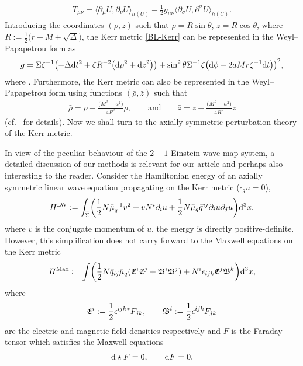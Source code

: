 \documentclass[11pt]{article}
\numberwithin{equation}{section}
\def\eps{\epsilon}%
\def\ptl{\partial}%
\def\ip#1#2{\langle#1,#2\rangle}
\def\olin#1{\overline{#1}{}}%
\newcommand{\leftexp}[2]{{\vphantom{#2}}^{#1}{#2}}
\def\halb{\frac{1}{2}}%
\renewcommand{\r}{\rho}
\numberwithin{equation}{section}
\begin{document}
\begin{align*}
T_{\mu \nu} = \ip{\ptl_\mu U} {\ptl_\nu U }_{h(U)} - \halb g_{\mu \nu} \ip{\ptl_\sigma U}{ \ptl^\sigma U}_{h(U)}.
\end{align*}
Introducing the coordinates $(\r, z)$ such that $\r = R \sin \theta$, $z= R \cos
\theta$, where $R := \halb \bigl(r-M+ \sqrt{\Delta}\bigr)$, the Kerr metric \eqref{BL-Kerr} can be represented in the Weyl--Papapetrou form as
\begin{align*}
\bar{g} = \Sigma \zeta^{-1} \bigl(-\Delta {\rm d}t^2 + \zeta R^{-2} \bigl({\rm d}\r^2 + {\rm d}z^2\bigr)\bigr) + \sin^2\theta \Sigma^{-1} \zeta
\bigl({\rm d}\phi - 2aMr \zeta^{-1} {\rm d}t\bigr)\bigr)^2,
\end{align*}
where . Furthermore, the Kerr metric can also be represented in the Weyl--Papapetrou form using functions $(\bar{\r}, \bar{z})$
such that
\begin{align*}
\bar{\r} = \r - \frac{\bigl(M^2 -a^2\bigr)}{4 R^2}\r, \qquad \text{and} \qquad \bar{z} = z + \frac{\bigl(M^2 -a^2\bigr)}{4 R^2}z
\end{align*}
(cf.\ \cite[Appendix A]{GM17_gentitle} for details). Now we shall turn to the axially symmetric perturbation theory of the Kerr metric.

In view of the peculiar behaviour of the $2 + 1$ Einstein-wave map system, a detailed discussion of our methods is relevant for our article and perhaps also interesting to the reader. Consider the Hamiltonian energy of an axially symmetric linear wave equation propagating on the Kerr metric ($\square_g u =0$),
\begin{align*}
H^{\text{LW}} := \int_{\olin{\Sigma}} \biggl(\halb \bar{N}\bar{\mu}^{-1}_q v^2 + vN^i \ptl_i u+ \halb N \bar{\mu}_q \bar{q}^{ij} \ptl_i u \ptl_j u \biggr) {\rm d}^3 x,
\end{align*}
where $v$ is the conjugate momentum of $u$, the energy is directly positive-definite.
However, this simplification does not carry forward to the Maxwell equations on the Kerr metric
\[
H^{{\rm Max}} := \int \biggl(\halb N \bar{q}_{ij} \bar{\mu}_q (\mathfrak{E}^i \mathfrak{E}^j + \mathfrak{B}^i \mathfrak{B}^j) + N^i \eps_{ijk}\mathfrak{E}^j \mathfrak{B}^k \biggr) {\rm d}^3 x,
\]
where
\[
\mathfrak{E}^i := \halb \eps^{ijk} \leftexp{*}F_{jk}, \qquad
\mathfrak{B}^i := \halb \eps^{ijk} F_{jk}
\]
are the electric and magnetic field densities respectively and $F$ is the Faraday tensor which satisfies the Maxwell equations
\begin{align*}
 {\rm d} \star F =0, \qquad {\rm d} F =0.
\end{align*}
\end{document}
